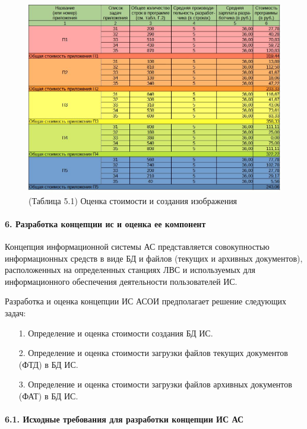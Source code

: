 \documentclass[12pt, a4paper, simple]{eskdtext}
\begin{document}
    \begin{figure}[ph!]
        \centering
        \includegraphics[width=16cm]
            {_docs/ОценкаСтоимостиСозданияПриложений.jpg}
        \caption{(Таблица 5.1) Оценка стоимости и создания изображения}
    \end{figure}

    \newpage

    \paragraph{6. Разработка концепции ис и оценка ее компонент} \hspace{0pt}

    Концепция информационной системы АС представляется совокупностью информационных средств в виде БД и файлов (текущих и архивных документов), расположенных на определенных стан­циях ЛВС и используемых для информационного обеспечения деятельности пользователей ИС.

    Разработка и оценка концепции ИС АСОИ предполагает ре­шение следую­щих задач:
    \begin{enumerate}
        \item[1.] Определение и оценка стоимости создания БД ИС.
        \item[2.] Определение и оценка стоимости загрузки файлов текущих документов (ФТД) в БД ИС.
        \item[3.] Определение и оценка стоимости загрузки файлов архивных документов (ФАТ) в БД ИС.
    \end{enumerate}

    \paragraph{6.1. Исходные требования для разработки концепции ИС АС} \hspace{0pt}
\end{document}
